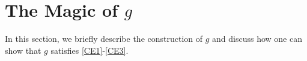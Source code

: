 \section{The Magic of $g$}
\label{Ch4:Sec:g_Properties}

In this section, we briefly describe the construction of $g$ and discuss how one can show that $g$ satisfies \ref{CE1}-\ref{CE3}.

